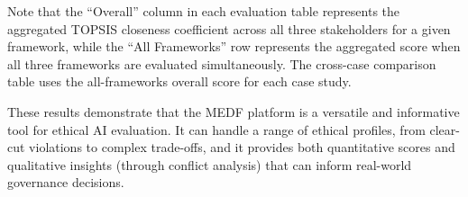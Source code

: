 Note that the \enquote{Overall} column in each evaluation table represents the aggregated TOPSIS closeness coefficient across all three stakeholders for a given framework, while the \enquote{All Frameworks} row represents the aggregated score when all three frameworks are evaluated simultaneously. The cross-case comparison table uses the all-frameworks overall score for each case study.

These results demonstrate that the MEDF platform is a versatile and informative tool for ethical AI evaluation. It can handle a range of ethical profiles, from clear-cut violations to complex trade-offs, and it provides both quantitative scores and qualitative insights (through conflict analysis) that can inform real-world governance decisions.

